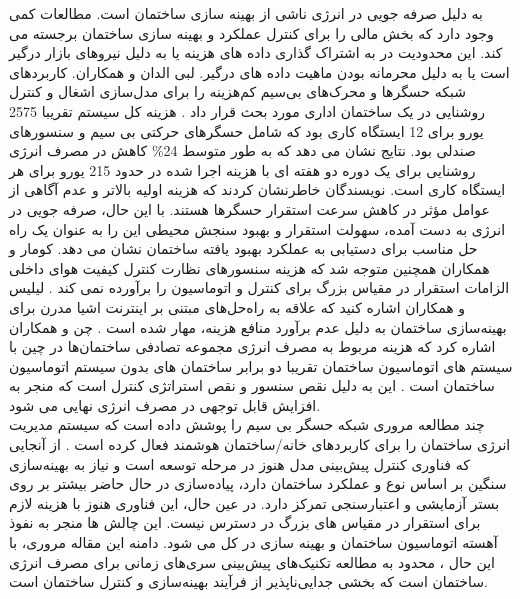       به دلیل صرفه جویی در انرژی ناشی از بهینه سازی ساختمان است. مطالعات کمی وجود دارد که بخش مالی را برای کنترل عملکرد و بهینه سازی ساختمان 
     برجسته می کند. این محدودیت در به اشتراک گذاری داده های هزینه یا به دلیل 
     نیروهای بازار درگیر است یا به دلیل محرمانه بودن ماهیت داده های درگیر. لبی الدان 
     و همکاران. کاربردهای شبکه حسگرها و محرک‌های بی‌سیم کم‌هزینه را برای مدل‌سازی اشغال و کنترل روشنایی در یک ساختمان
      اداری مورد بحث قرار داد \cite{labeodan2016application}. هزینه کل سیستم تقریبا 2575 یورو برای 12 ایستگاه کاری بود که
      شامل حسگرهای حرکتی بی سیم و سنسورهای صندلی بود. نتایج نشان می دهد که به طور متوسط 24\% کاهش در مصرف انرژی روشنایی برای یک دوره
      دو هفته ای با هزینه اجرا شده در حدود 215 یورو برای هر ایستگاه کاری است. نویسندگان خاطرنشان کردند که هزینه اولیه بالاتر و عدم آگاهی از عوامل مؤثر
      در کاهش سرعت استقرار حسگرها هستند. با این حال، صرفه جویی در انرژی به دست آمده، سهولت استقرار و بهبود سنجش محیطی این
      را به عنوان یک راه حل مناسب برای دستیابی به عملکرد بهبود 
      یافته ساختمان نشان می دهد. کومار و همکاران همچنین متوجه شد که هزینه سنسورهای نظارت کنترل کیفیت هوای داخلی الزامات استقرار در مقیاس بزرگ برای کنترل و اتوماسیون را
       برآورده نمی کند \cite{kumar2016real}. لیلیس و همکاران اشاره کنید
       که علاقه به راه‌حل‌های 
      مبتنی بر اینترنت اشیا مدرن برای بهینه‌سازی ساختمان به دلیل عدم برآورد منافع هزینه، مهار شده است \cite{lilis2017towards}. چن و همکاران اشاره کرد
       که هزینه مربوط به مصرف انرژی مجموعه تصادفی ساختمان‌ها در چین با سیستم های اتوماسیون ساختمان تقریبا دو برابر ساختمان های
       بدون سیستم اتوماسیون ساختمان است \cite{chen2016cost}. این به دلیل نقص سنسور و نقص استراتژی کنترل است که منجر به افزایش قابل توجهی در مصرف انرژی نهایی می شود.
        \\
        چند مطالعه مروری شبکه حسگر بی سیم را پوشش داده است که سیستم مدیریت انرژی ساختمان را برای کاربردهای خانه/ساختمان 
        هوشمند فعال کرده است \cite{kazmi2014review,kuzlu2015review}. از آنجایی که فناوری کنترل پیش‌بینی مدل هنوز در مرحله توسعه است و 
        نیاز به بهینه‌سازی سنگین بر اساس نوع و عملکرد ساختمان دارد،
         پیاده‌سازی در حال حاضر بیشتر بر روی بستر آزمایشی و اعتبارسنجی تمرکز دارد. در عین حال، این فناوری هنوز
         با هزینه لازم برای استقرار در مقیاس های بزرگ در دسترس نیست. 
         این چالش ها منجر به نفوذ آهسته اتوماسیون ساختمان و بهینه سازی در کل می شود. دامنه این مقاله مروری، با این حال
        ، محدود به مطالعه تکنیک‌های پیش‌بینی سری‌های زمانی برای مصرف انرژی ساختمان است که بخشی جدایی‌ناپذیر
         از فرآیند بهینه‌سازی و کنترل ساختمان است.
